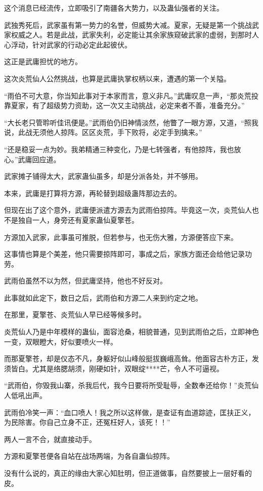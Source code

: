 \begin{this_body}
这个消息已经流传，立即吸引了南疆各大势力，以及蛊仙强者的关注。

武独秀死后，武家虽有第一势力的名誉，但威势大减。夏家，无疑是第一个挑战武家权威之人。若是此战，武家失利，必定能让其余家族窥破武家的虚弱，到那时人心浮动，针对武家的行动必定此起彼伏。

这正是武庸担忧的地方。

这次炎荒仙人公然挑战，也算是武庸执掌权柄以来，遭遇的第一个关隘。

“雨伯不可大意，你当知此事对于本家而言，意义非凡。”武庸叹息一声，“那炎荒投靠夏家，有了超级势力资助，这一次又主动挑战，必定来者不善，准备充分。”

“大长老只管聆听佳讯便是。”武雨伯仍旧神情淡然，他瞥了一眼方源，又道，“照我说，此战无须他人掠阵。区区炎荒，手下败将，必定手到擒来。”

“还是稳妥一点为妙。我弟精通三种变化，乃是七转强者，有他掠阵，我也放心。”武庸回应道。

武家摊子铺得太大，武家蛊仙虽多，却是分派各处，并不够用。

本来，武庸是打算将方源，再轮替到超级蛊阵那边去的。

但现在出了这个意外，武庸便派遣方源去为武雨伯掠阵。毕竟这一次，炎荒仙人也不是独自一人，身旁还有夏家蛊仙夏擎苍。

方源加入武家，此事虽可推脱，但若参与，也无伤大雅，方源便答应下来。

这事情也算是个美差，他只需要掠阵即可，事成之后，家族方面还会给他记录功劳。

武雨伯虽然不以为然，但武庸坚持，他也不好反对。

此事就如此定下，数日之后，武雨伯和方源二人来到约定之地。

在那里，夏擎苍、炎荒仙人早已经等候多时。

炎荒仙人乃是中年模样的蛊仙，面容沧桑，相貌普通，见到武雨伯之后，立即神色一变，双眼瞪大，好似要喷火一样。

而那夏擎苍，却是仪态不凡，身躯好似山峰般挺拔巍峨高耸。他面容古朴方正，发须皆白。尤其是络腮胡须，刚硬如针，双眼绽****芒，令人不可逼视。

“武雨伯，你毁我山寨，杀我后代，我今日要将所受耻辱，全数奉还给你！”炎荒仙人低吼出声。

武雨伯冷笑一声：“血口喷人！我之所以这样做，是查证有血道踪迹，匡扶正义，为民除害。你自己立身不正，还冤枉好人，该死！！”

两人一言不合，就直接动手。

方源和夏擎苍便各自站在战场两端，为各自蛊仙掠阵。

没有什么说的，真正的缘由大家心知肚明，但正道做事，自然要披上一层好看的皮。


\end{this_body}
